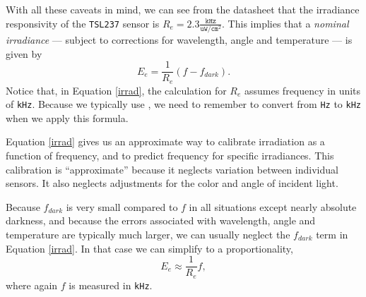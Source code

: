 With all these caveats in mind, we can see from the datasheet that the irradiance responsivity of the \texttt{TSL237} sensor is $R_e=2.3 \frac{\mathtt{kHz}}{\mathtt{uW}/\mathtt{cm}^2}$.
This implies that a \emph{nominal irradiance} --- subject to corrections for wavelength, angle and temperature --- is given by
\begin{equation}\label{irrad}
E_e = \frac{1}{R_e} (f-f_{dark}) .
\end{equation}
Notice that, in Equation \ref{irrad}, the calculation for $R_e$ assumes frequency in units of \texttt{kHz}. 
Because we typically use , we need to remember to convert from \texttt{Hz} to \texttt{kHz} when we apply this formula.

Equation \ref{irrad} gives us an approximate way to calibrate irradiation as a function of frequency, and to predict frequency for specific irradiances.
This calibration is ``approximate'' because it neglects variation between individual sensors.
It also neglects adjustments for the color and angle of incident light.

Because $f_{dark}$ is very small compared to $f$ in all situations except nearly absolute darkness, and because the errors associated with wavelength, angle and temperature are typically much larger, we can usually neglect the $f_{dark}$ term in Equation \ref{irrad}.
In that case we can simplify to a proportionality,
\begin{equation}\label{irrad2}
E_e \approx \frac{1}{R_e} f,
\end{equation}
where again $f$ is measured in \texttt{kHz}.
 
